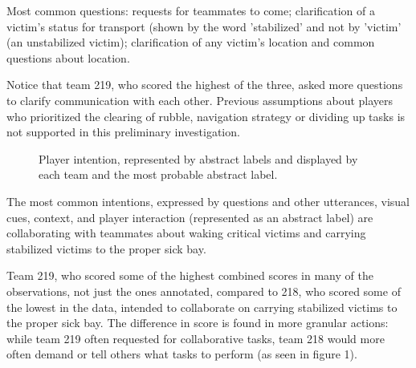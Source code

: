 \documentclass[10pt]{article}
\begin{document}
Most common questions: requests for teammates to come; clarification of a victim's status for transport (shown by the word 'stabilized' and not by 'victim' (an unstabilized victim); clarification of any victim's location and common questions about location.

Notice that team 219, who scored the highest of the three, asked more questions to clarify communication with each other. Previous assumptions about players who prioritized the clearing of rubble, navigation strategy or dividing up tasks is not supported in this preliminary investigation.

\clearpage
\begin{figure}[h!]
    \centering
    \caption{Player intention, represented by abstract labels and displayed by each team and the most probable abstract label. }
\end{figure}

The most common intentions, expressed by questions and other utterances, visual cues, context, and player interaction (represented as an abstract label) are collaborating with teammates about waking critical victims and carrying stabilized victims to the proper sick bay. 

Team 219, who scored some of the highest combined scores in many of the observations, not just the ones annotated, compared to 218, who scored some of the lowest in the data, intended to collaborate on carrying stabilized victims to the proper sick bay. The difference in score is found in more granular actions: while team 219 often requested for collaborative tasks, team 218 would more often demand or tell others what tasks to perform (as seen in figure 1).




\clearpage
\end{document}
